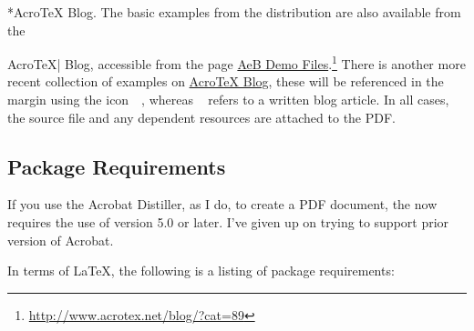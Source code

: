 \documentclass{article}
\makeatletter
\renewcommand{\paragraph}
    {\@startsection{paragraph}{4}{0pt}{6pt}{-3pt}
    {\normalfont\normalsize\bfseries}}
\def\AcroT{Acro\!\TeX}\def\cAcroT{\textcolor{blue}{\AcroT}}
\def\bUrl{http://www.math.uakron.edu/~dpstory}
\def\AcroTeX{Acro\!\TeX}
\newcommand{\exPDF}[2][\bUrl/webeq_ex.html\#]{\par\ifdim\lastskip>0pt\relax\vskip-\lastskip\fi
\vskip\medskipamount\noindent\makebox[0pt][r]
    {\raisebox{-2pt}{\color{red}\href{#1#2}{{\zqacr
    b\hspace{9.5pt}}}}\enspace}\ignorespaces}
\makeatother
\begin{document}
\paragraph*{{Acro\!\TeX} Blog.} The basic examples from the distribution are also available
from the {Acro\!\TeX| Blog, accessible from the page
\href{http://www.acrotex.net/blog/?cat=89}{AeB Demo Files}.\footnote{\url{http://www.acrotex.net/blog/?cat=89}}
There is another more recent collection of examples on
\href{\urlAcroTeXBlog}{\AcroTeX{} Blog}, these will be referenced in the margin using the icon %
\mbox{%
    }\,, whereas
\mbox{%
} refers to a written blog
article. In all cases, the source file and any dependent resources are attached to the
PDF.

%



\subsection{Package Requirements}

If you use the Acrobat Distiller, as I do, to create a PDF document, the {\cAcroB}
now requires the use of version 5.0 or later. I've given up on trying to support
prior version of Acrobat.

\newtopic In terms of \LaTeX, the following is a listing of package requirements:

}
\end{document}
